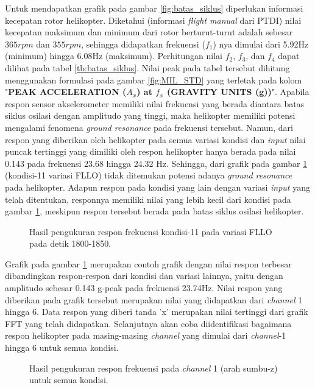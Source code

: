 Untuk mendapatkan grafik pada gambar \ref{fig:batas_siklus} diperlukan informasi kecepatan rotor helikopter. Diketahui (informasi \textit{flight manual} dari PTDI) nilai kecepatan maksimum dan minimum dari rotor berturut-turut adalah sebesar $365 rpm$ dan $355 rpm$, sehingga didapatkan frekuensi ($f_1$) nya dimulai dari 5.92Hz (minimum) hingga 6.08Hz (maksimum). Perhitungan nilai $f_2$, $f_3$, dan $f_4$ dapat dilihat pada tabel \ref{tb:batas_siklus}. Nilai peak pada tabel tersebut dihitung menggunakan formulasi pada gambar \ref{fig:MIL_STD} yang terletak pada kolom "\textbf{PEAK ACCELERATION ($A_x$) at $f_x$ (GRAVITY UNITS (g))}". Apabila respon sensor akselerometer memiliki nilai frekuensi yang berada diantara batas siklus osilasi dengan amplitudo yang tinggi, maka helikopter memiliki potensi mengalami fenomena \textit{ground resonance} pada frekuensi tersebut. Namun, dari respon yang diberikan oleh helikopter pada semua variasi kondisi dan \textit{input} nilai puncak tertinggi yang dimiliki oleh respon helikopter hanya berada pada nilai 0.143 pada frekuensi 23.68 hingga 24.32 Hz. Sehingga, dari grafik pada gambar \ref{fig:11_FLLO} (kondisi-11 variasi FLLO) tidak ditemukan potensi adanya \textit{ground resonance} pada helikopter. Adapun respon pada kondisi yang lain dengan variasi \textit{input} yang telah ditentukan, responnya memiliki nilai yang lebih kecil dari kondisi pada gambar \ref{fig:11_FLLO}, meskipun respon tersebut berada pada batas siklus osilasi helikopter.

\begin{figure}[h]
	\centering
	\caption{Hasil pengukuran respon frekuensi kondisi-11 pada variasi FLLO pada detik 1800-1850.}
	\label{fig:11_FLLO}
\end{figure}

Grafik pada gambar \ref{fig:11_FLLO} merupakan contoh grafik dengan nilai respon terbesar dibandingkan respon-respon dari kondisi dan variasi lainnya, yaitu dengan amplitudo sebesar 0.143 g-peak pada frekuensi 23.74Hz. Nilai respon yang diberikan pada grafik tersebut merupakan nilai yang didapatkan dari \textit{channel} 1 hingga 6. Data respon yang diberi tanda 'x' merupakan nilai tertinggi dari grafik FFT yang telah didapatkan. Selanjutnya akan coba diidentifikasi bagaimana respon helikopter pada masing-masing \textit{channel} yang dimulai dari \textit{channel}-1 hingga 6 untuk semua kondisi.

\begin{figure}[H]
	\centering
	\caption{Hasil pengukuran respon frekuensi pada \textit{channel} 1 (arah sumbu-z) untuk semua kondisi.}
	\label{fig:channel_1}
\end{figure}

